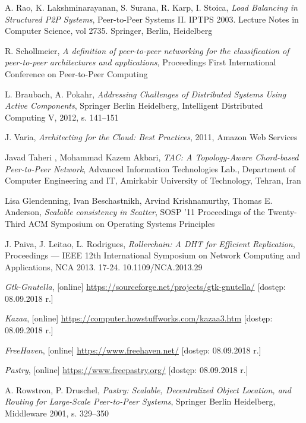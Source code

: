 \documentclass[12pt, twoside, openany]{report}
\begin{document}
\begin{thebibliography}{11}
 A. Rao, K. Lakshminarayanan, S. Surana, R. Karp, I. Stoica, \emph{Load Balancing in Structured P2P Systems}, Peer-to-Peer Systems II. IPTPS 2003. Lecture Notes in Computer Science, vol 2735. Springer, Berlin, Heidelberg

 R. Schollmeier, \emph{A definition of peer-to-peer networking for the classification of peer-to-peer architectures and applications}, Proceedings First International Conference on Peer-to-Peer Computing

 L. Braubach, A. Pokahr, \emph{Addressing Challenges of Distributed Systems Using Active Components}, Springer Berlin Heidelberg, Intelligent Distributed Computing V, 2012, s. 141--151

 J. Varia, \emph{Architecting for the Cloud: Best Practices}, 2011, Amazon Web Services

 Javad Taheri , Mohammad Kazem Akbari, \emph{TAC: A Topology-Aware Chord-based Peer-to-Peer Network}, Advanced Information Technologies Lab., Department of Computer Engineering and IT, Amirkabir University of Technology, Tehran, Iran

 Lisa Glendenning, Ivan Beschastnikh, Arvind Krishnamurthy, Thomas E. Anderson, \emph{Scalable consistency in Scatter}, SOSP '11 Proceedings of the Twenty-Third ACM Symposium on Operating Systems Principles

 J. Paiva, J. Leitao, L. Rodrigues, \emph{Rollerchain: A DHT for Efficient Replication}, Proceedings --- IEEE 12th International Symposium on Network Computing and Applications, NCA 2013. 17-24. 10.1109/NCA.2013.29

 \emph{Gtk-Gnutella}, [online] \url{https://sourceforge.net/projects/gtk-gnutella/} [dostęp: 08.09.2018 r.]

 \emph{Kazaa}, [online] \url{https://computer.howstuffworks.com/kazaa3.htm} [dostęp: 08.09.2018 r.]

 \emph{FreeHaven}, [online] \url{https://www.freehaven.net/} [dostęp: 08.09.2018 r.]

 \emph{Pastry}, [online] \url{https://www.freepastry.org/} [dostęp: 08.09.2018 r.]

 A. Rowstron, P. Druschel, \emph{Pastry: Scalable, Decentralized Object Location, and Routing for Large-Scale Peer-to-Peer Systems}, Springer Berlin Heidelberg, Middleware 2001, s. 329--350


\end{thebibliography}
\end{document}
